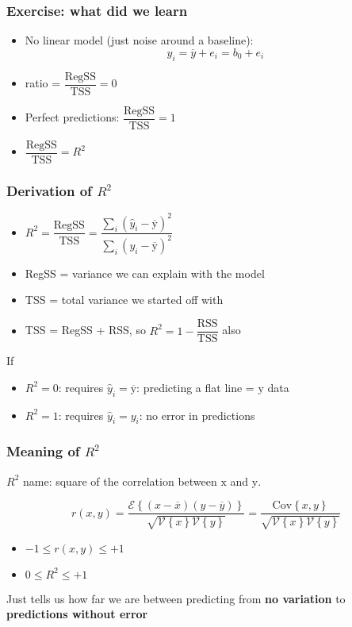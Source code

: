 \begin{frame}\frametitle{Exercise: what did we learn}
	\begin{itemize}
		\item	No linear model (just noise around a baseline): 
		$$y_i = \overline{y} + e_i = b_0 + e_i$$
		
		\item	ratio = $\dfrac{\text{RegSS}}{\text{TSS}} = 0$
		\item	Perfect predictions: $\dfrac{\text{RegSS}}{\text{TSS}} = 1$
		\item	$\dfrac{\text{RegSS}}{\text{TSS}} = R^2$
	\end{itemize}
\end{frame}

\begin{frame}\frametitle{Derivation of $R^2$}
	\begin{itemize}
		\item	$R^2 = \dfrac{\text{RegSS}}{\text{TSS}} = \dfrac{\sum_i{ \left(\hat{y}_i - \overline{\mathrm{y}}\right)^2}}{\sum_i{ \left(y_i - \overline{\mathrm{y}}\right)^2}}$
		\item	RegSS = variance we can explain with the model
		\item	TSS = total variance we started off with
		\item	TSS = RegSS + RSS, so $R^2 = 1-\dfrac{\text{RSS}}{\text{TSS}}$ also
	\end{itemize}

	If
	\begin{itemize}
		\item	$R^2 = 0$: requires $\hat{y}_i = \overline{\mathrm{y}}$: predicting a flat line = $\mathrm{y}$ data
		\item	$R^2 = 1$: requires $\hat{y}_i = y_i$: no error in predictions
	\end{itemize}
\end{frame}

\begin{frame}\frametitle{Meaning of $R^2$}

	$R^2$ name: square of the correlation between $\mathrm{x}$ and $\mathrm{y}$.

	$$ r(x, y) = \dfrac{\mathcal{E}\left\{ (x - \overline{x}) (y - \overline{y})\right\}}{\sqrt{\mathcal{V}\left\{x\right\}\mathcal{V}\left\{y\right\}}} = \dfrac{\text{Cov}\left\{x, y\right\}}{\sqrt{\mathcal{V}\left\{x\right\}\mathcal{V}\left\{y\right\}}} $$
	\begin{itemize}
		\item	$-1 \leq r(x,y) \leq +1$
		\item	$0 \leq R^2 \leq +1 $
	\end{itemize}
	
	\vspace{12pt}
	Just tells us how far we are between predicting from \textbf{no variation} to \textbf{predictions without error}
\end{frame}

